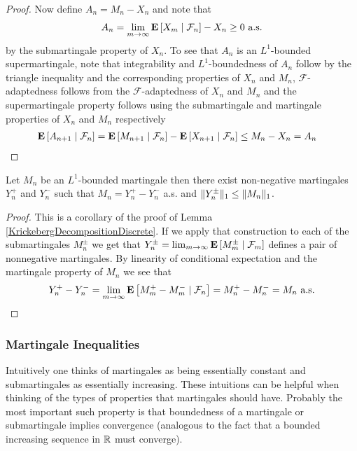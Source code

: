 \begin{proof}
Now define $A_n = M_n - X_n$ and note that 
\begin{align*}
A_n = \lim_{m \to \infty} \cexpectationlong{\mathcal{F}_n}{X_m} - X_n \geq
0 \text{ a.s.}
\end{align*}
by the submartingale property of $X_n$.  To see that $A_n$ is an $L^1$-bounded
supermartingale, note that integrability and $L^1$-boundedness of $A_n$ follow by the
triangle inequality and the corresponding properties of $X_n$ and $M_n$, $\mathcal{F}$-adaptedness follows from the
$\mathcal{F}$-adaptedness of $X_n$ and $M_n$ and the supermartingale
property follows using the submartingale and martingale properties of
$X_n$ and $M_n$ respectively
\begin{align*}
\cexpectationlong{\mathcal{F}_n}{A_{n+1}} &=
\cexpectationlong{\mathcal{F}_n}{M_{n+1}} -
\cexpectationlong{\mathcal{F}_n}{X_{n+1}} \leq M_n - X_n = A_n
\end{align*}
\end{proof}

\begin{lem}Let $M_n$ be an $L^1$-bounded martingale then there exist
  non-negative martingales $Y_n^+$ and $Y_n^-$ such that $M_n = Y_n^+
  - Y_n^-$ a.s. and $\norm{Y_n^\pm}_1 \leq \norm{M_n}_1$.
\end{lem}
\begin{proof}
This is a corollary of the proof of Lemma
\ref{KrickebergDecompositionDiscrete}.  If we apply that construction
to each of the submartingales $M_n^\pm$ we get that $Y_n^\pm = \lim_{m
  \to \infty} \cexpectationlong{\mathcal{F}_m}{M_m^\pm}$ defines a
pair of nonnegative martingales.  By linearity of conditional
expectation and the martingale property of $M_n$ we see that
\begin{align*}
Y_n^+ - Y_n^- = \lim_{m \to \infty}
\cexpectationlong{\mathcal{F}_n}{M_m^+ - M_m^-} = M_n^+ - M_n^- = M_n
\text{ a.s.}
\end{align*}
\end{proof}

\subsubsection{Martingale Inequalities}
Intuitively one thinks of martingales as being essentially constant
and submartingales as essentially increasing.  These intuitions can be
helpful when thinking of the types of properties that martingales
should have.  Probably the most important such property is that
boundedness of  a martingale or submartingale implies convergence (analogous
to the fact that a bounded increasing sequence in $\reals$ must converge).  

